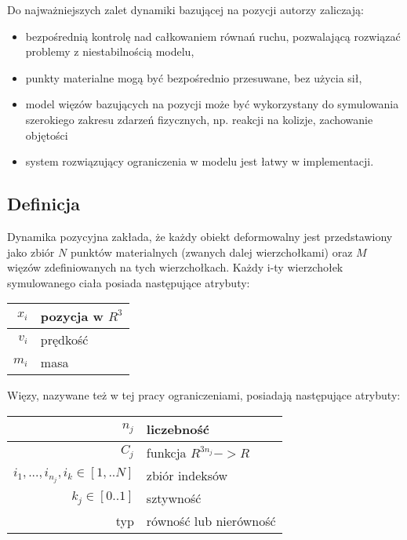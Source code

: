 Do najważniejszych zalet dynamiki bazującej na pozycji autorzy \cite{pbdyn}
zaliczają:
\begin{itemize}
	\item bezpośrednią kontrolę nad całkowaniem równań ruchu, pozwalającą
	rozwiązać problemy z niestabilnością modelu,
	\item punkty materialne mogą być bezpośrednio przesuwane, bez użycia sił,
	\item model więzów bazujących na pozycji może być wykorzystany do
	symulowania szerokiego zakresu zdarzeń fizycznych, np. reakcji na kolizje, zachowanie objętości
	\item system rozwiązujący ograniczenia w modelu jest łatwy w implementacji.
\end{itemize}

\subsection{Definicja}
Dynamika pozycyjna zakłada, że każdy obiekt deformowalny jest przedstawiony jako zbiór $N$
punktów materialnych (zwanych dalej wierzchołkami) oraz $M$ więzów
zdefiniowanych na tych wierzchołkach. Każdy i-ty wierzchołek symulowanego ciała posiada
następujące atrybuty:

\vspace{0.5cm}
\centering
\begin{tabular}{|r|l|}
\hline
$x_i$ & pozycja w $R^3$ \\
\hline
$v_i$ & prędkość \\
\hline
$m_i$ & masa\\
\hline
\end{tabular}
\vspace{0.5cm}

\raggedright
Więzy, nazywane też w tej pracy ograniczeniami, posiadają następujące atrybuty:
\vspace{0.5cm}

\centering
\begin{tabular}{|r|l|}
\hline
$n_j$ & liczebność \\
\hline
$C_j$ & funkcja $R^{3n_j} -> R$\\
\hline
${i_1, ..., i_{n_j}}, i_k \in [1,..N]$ & zbiór indeksów\\
\hline
$k_j \in [0.. 1]$ & sztywność\\
\hline
typ & równość lub nierówność\\
\hline
\end{tabular}
\vspace{0.5cm}

